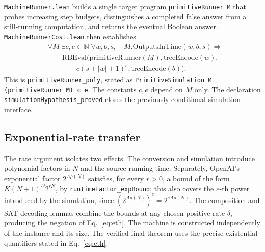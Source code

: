 \documentclass[11pt,letterpaper]{article}
\newcommand{\lean}[1]{\texttt{#1}}
\begin{document}
\lean{MachineRunner.lean} builds a single target program \lean{primitiveRunner M} that probes increasing step budgets, distinguishes a completed false answer from a still-running computation, and returns the eventual Boolean answer. \lean{MachineRunnerCost.lean} then establishes
\begin{equation}
\begin{aligned}
&\forall M\;\exists c,e\in\mathbb N\;\forall w,b,s,\quad M.\mathrm{OutputsInTime}(w,b,s)\Longrightarrow\\
&\qquad\mathrm{RBEval}\bigl(\mathrm{primitiveRunner}(M),\mathrm{treeEncode}(w),\\
&\qquad\qquad c(s+|w|+1)^e,\mathrm{treeEncode}(b)\bigr).
\end{aligned}
\label{eq:sim}
\end{equation}
This is \lean{primitiveRunner\_poly}, stated as \lean{PrimitiveSimulation M (primitiveRunner M) c e}. The constants $c,e$ depend on $M$ only. The declaration \lean{simulationHypothesis\_proved} closes the previously conditional simulation interface.

\subsection{Exponential-rate transfer}
The rate argument isolates two effects. The conversion and simulation introduce polynomial factors in $N$ and the source running time. Separately, OpenAI's exponential factor $2^{A\rho(N)}$ satisfies, for every $r>0$, a bound of the form $K(N+1)^D2^{rN}$, by \lean{runtimeFactor\_expBound}; this also covers the $e$-th power introduced by the simulation, since $(2^{A\rho(N)})^e=2^{eA\rho(N)}$. The composition and SAT decoding lemmas combine the bounds at any chosen positive rate $\delta$, producing the negation of Eq.~\eqref{eq:eth}. The machine is constructed independently of the instance and its size. The verified final theorem uses the precise existential quantifiers stated in Eq.~\eqref{eq:eth}.
\end{document}
